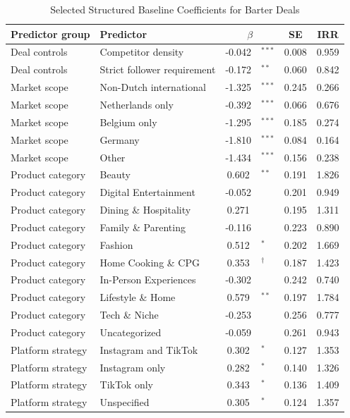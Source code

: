 \begin{table}[htbp]
\centering
\small
\caption{Selected Structured Baseline Coefficients for Barter Deals}
\label{tab:barter_baseline_coefficients}
\begin{tabular}{
@{}
>{\raggedright\arraybackslash}p{2.45cm}
>{\raggedright\arraybackslash}p{4.15cm}
S[table-format=-1.3]
@{}l
S[table-format=1.3]
S[table-format=1.3]
@{}
}
\toprule
Predictor group & Predictor &  & {SE} & {IRR} \\
\midrule
Deal controls & Competitor density & -0.042 & $^{***}$ & 0.008 & 0.959 \\
Deal controls & Strict follower requirement & -0.172 & $^{**}$ & 0.060 & 0.842 \\

Market scope & Non-Dutch international & -1.325 & $^{***}$ & 0.245 & 0.266 \\
Market scope & Netherlands only & -0.392 & $^{***}$ & 0.066 & 0.676 \\
Market scope & Belgium only & -1.295 & $^{***}$ & 0.185 & 0.274 \\
Market scope & Germany & -1.810 & $^{***}$ & 0.084 & 0.164 \\
Market scope & Other & -1.434 & $^{***}$ & 0.156 & 0.238 \\

Product category & Beauty & 0.602 & $^{**}$ & 0.191 & 1.826 \\
Product category & Digital Entertainment & -0.052 &  & 0.201 & 0.949 \\
Product category & Dining \& Hospitality & 0.271 &  & 0.195 & 1.311 \\
Product category & Family \& Parenting & -0.116 &  & 0.223 & 0.890 \\
Product category & Fashion & 0.512 & $^{*}$ & 0.202 & 1.669 \\
Product category & Home Cooking \& CPG & 0.353 & $^{\dagger}$ & 0.187 & 1.423 \\
Product category & In-Person Experiences & -0.302 &  & 0.242 & 0.740 \\
Product category & Lifestyle \& Home & 0.579 & $^{**}$ & 0.197 & 1.784 \\
Product category & Tech \& Niche & -0.253 &  & 0.256 & 0.777 \\
Product category & Uncategorized & -0.059 &  & 0.261 & 0.943 \\

Platform strategy & Instagram and TikTok & 0.302 & $^{*}$ & 0.127 & 1.353 \\
Platform strategy & Instagram only & 0.282 & $^{*}$ & 0.140 & 1.326 \\
Platform strategy & TikTok only & 0.343 & $^{*}$ & 0.136 & 1.409 \\
Platform strategy & Unspecified & 0.305 & $^{*}$ & 0.124 & 1.357 \\


\end{tabular}
\end{table}
